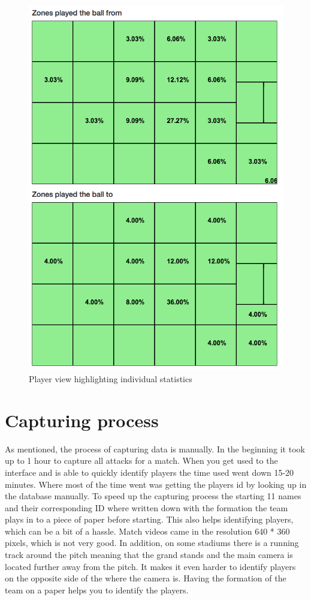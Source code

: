 \begin{figure}[H]
\centering
\includegraphics[width=1\textwidth]{images/general/player_view2.png}
\caption{Player view highlighting individual statistics}
\label{fig:player_view2}
\end{figure}


\section{Capturing process}
\label{sec:capprocess}

As mentioned, the process of capturing data is manually. In the beginning it took up to 1 hour to capture all attacks for a match. When you get used to the interface and is able to quickly identify players the time used went down 15-20 minutes. Where most of the time went was getting the players id by looking up in the database manually. To speed up the capturing process the starting 11 names and their corresponding ID where written down with the formation the team plays in to a piece of paper before starting. This also helps identifying players, which can be a bit of a hassle. Match videos came in the resolution 640 * 360 pixels, which is not very good. In addition, on some stadiums there is a running track around the pitch meaning that the grand stands and the main camera is located further away from the pitch. It makes it even harder to identify players on the opposite side of the where the camera is. Having the formation of the team on a paper helps you to identify the players.


